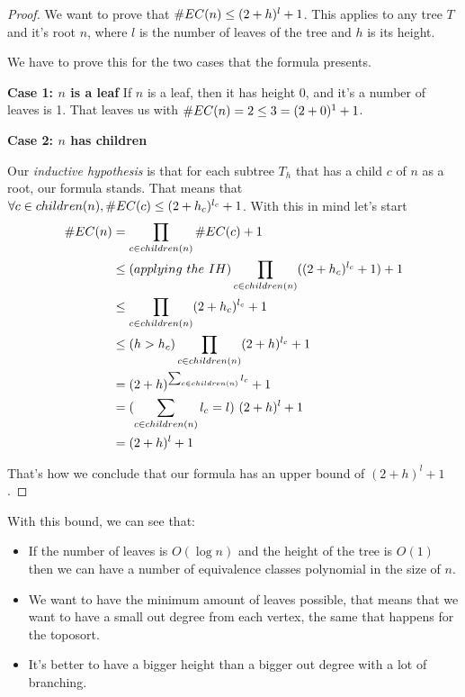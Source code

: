     \begin{proof}
        We want to prove that $\#EC(n) \leq (2+h)^l + 1$. This applies to any tree $T$ and it's root $n$, where $l$ is the number of leaves of the tree and $h$ is its height.

        We have to prove this for the two cases that the formula presents. 

        \textbf{Case 1: $n$ is a leaf}
        If $n$ is a leaf, then it has height 0, and it's a number of leaves is 1. That leaves us with  $\#EC(n) = 2\leq  3 = (2+0)^1 + 1$. 

        \textbf{Case 2: $n$ has children}

        Our \textit{inductive hypothesis} is that for each subtree $T_h$ that has a child $c$ of $n$ as a root, our formula stands. That means that $\forall c \in children(n), \#EC(c) \leq (2+ h_c)^{l_c} + 1$. With this in mind let's start
        \begin{align}\label{eq:pr_equals_prprime}
            \#EC(n)  &= \prod_{c \in children(n)} \#EC(c) + 1 \\
            & \leq (applying \ the \ IH) \prod_{c \in children(n)} ((2+ h_c)^{l_c} + 1) + 1 \\
            & \leq \prod_{c \in children(n)} (2+ h_c)^{l_c} + 1 \\
            & \leq (h>h_c) \prod_{c \in children(n)} (2+ h)^{l_c} + 1 \\
            & = (2+ h)^{\sum_{c \in children(n)} l_c} + 1 \\
            & = (\sum_{c \in children(n)} l_c = l) \ (2+ h)^l + 1 \\
            & = (2+ h)^l + 1 \\
        \end{align}

    That's how we conclude that our formula has an upper bound of $(2+ h)^l + 1$. 
    \end{proof}

With this bound, we can see that: 

\begin{itemize}
    \item If the number of leaves is $O(\log n)$ and the height of the tree is $O(1)$ then we can have a number of equivalence classes polynomial in the size of $n$. 
    \item We want to have the minimum amount of leaves possible, that means that we want to have a small out degree from each vertex, the same that happens for the toposort. 
    \item It's better to have a bigger height than a bigger out degree with a lot of branching. 
\end{itemize}

